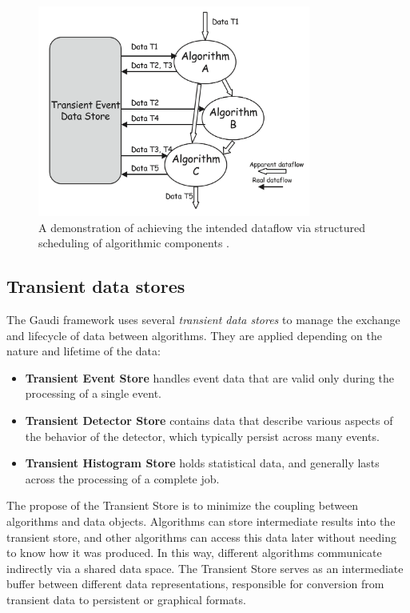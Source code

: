 \begin{figure}[htbp]
  \centering
  \includegraphics[width=0.8\textwidth]{figs/chapter3/Gaudi_dataflow.png}
  \caption{A demonstration of achieving the intended dataflow via structured scheduling of algorithmic components \cite{Gaudi}.}
  \label{fig:Gaudi_dataflow}
\end{figure}

\subsection{Transient data stores}
The Gaudi framework uses several \textit{transient data stores} to manage the exchange and lifecycle of data between algorithms. They are applied depending on the nature and lifetime of the data:

\begin{itemize}
    \item \textbf{Transient Event Store} handles event data that are valid only during the processing of a single event.
    \item \textbf{Transient Detector Store} contains data that describe various aspects of the behavior of the detector, which typically persist across many events.
    \item \textbf{Transient Histogram Store} holds statistical data, and generally lasts across the processing of a complete job.
\end{itemize}

The propose of the Transient Store is to minimize the coupling between algorithms and data objects. Algorithms can store intermediate results into the transient store, and other algorithms can access this data later without needing to know how it was produced. In this way, different algorithms communicate indirectly via a shared data space. The Transient Store serves as an intermediate buffer between different data representations, responsible for conversion from transient data to persistent or graphical formats.
